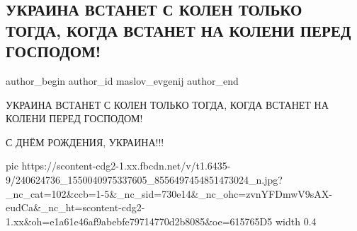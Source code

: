  
 
 
 
 
 
\subsection{УКРАИНА ВСТАНЕТ С КОЛЕН ТОЛЬКО ТОГДА, КОГДА ВСТАНЕТ НА КОЛЕНИ ПЕРЕД ГОСПОДОМ!}
\label{sec:24_08_2021.fb.maslov_evgenij.1.ukraina_gospod_nezalezhnist}
 
\ifcmt
 author_begin
   author_id maslov_evgenij
 author_end
\fi

УКРАИНА ВСТАНЕТ С КОЛЕН ТОЛЬКО ТОГДА, КОГДА ВСТАНЕТ НА КОЛЕНИ ПЕРЕД ГОСПОДОМ!

С ДНЁМ РОЖДЕНИЯ,  УКРАИНА!!!

\ifcmt
  pic https://scontent-cdg2-1.xx.fbcdn.net/v/t1.6435-9/240624736_1550040975337605_8556497454851473024_n.jpg?_nc_cat=102&ccb=1-5&_nc_sid=730e14&_nc_ohc=zvnYFDmwV9sAX-eudCa&_nc_ht=scontent-cdg2-1.xx&oh=e1a61e46af9abebfe79714770d2b8085&oe=615765D5
  width 0.4
\fi
